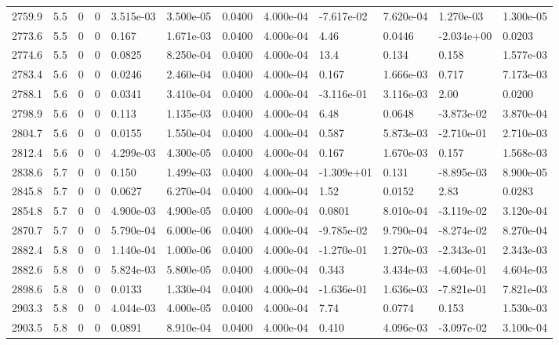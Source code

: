 \documentclass[preview]{standalone}
\begin{document}
{{{{{{{\begin{tabular}{L{1.2cm}C{1.2cm} C{0.3cm}C{0.5cm} C{1.4cm}C{1.4cm} C{1.4cm}C{1.4cm} C{1.6cm}C{1.6cm} C{1.6cm}C{1.6cm}}
  2759.9  &   5.5  & 0     &  0 &  3.515e-03  & 3.500e-05  &  0.0400&   4.000e-04& -7.617e-02 & 7.620e-04   &  1.270e-03 & 1.300e-05  \\ 
  2773.6  &   5.5  & 0     &  0 &  0.167  & 1.671e-03  &  0.0400&   4.000e-04& 4.46 & 0.0446   &  -2.034e+00 & 0.0203  \\ 
  2774.6  &   5.5  & 0     &  0 &  0.0825  & 8.250e-04  &  0.0400&   4.000e-04& 13.4 & 0.134   &  0.158 & 1.577e-03  \\ 
  2783.4  &   5.6  & 0     &  0 &  0.0246  & 2.460e-04  &  0.0400&   4.000e-04& 0.167 & 1.666e-03   &  0.717 & 7.173e-03  \\ 
  2788.1  &   5.6  & 0     &  0 &  0.0341  & 3.410e-04  &  0.0400&   4.000e-04& -3.116e-01 & 3.116e-03   &  2.00 & 0.0200  \\ 
  2798.9  &   5.6  & 0     &  0 &  0.113  & 1.135e-03  &  0.0400&   4.000e-04& 6.48 & 0.0648   &  -3.873e-02 & 3.870e-04  \\ 
  2804.7  &   5.6  & 0     &  0 &  0.0155  & 1.550e-04  &  0.0400&   4.000e-04& 0.587 & 5.873e-03   &  -2.710e-01 & 2.710e-03  \\ 
  2812.4  &   5.6  & 0     &  0 &  4.299e-03  & 4.300e-05  &  0.0400&   4.000e-04& 0.167 & 1.670e-03   &  0.157 & 1.568e-03  \\ 
  2838.6  &   5.7  & 0     &  0 &  0.150  & 1.499e-03  &  0.0400&   4.000e-04& -1.309e+01 & 0.131   &  -8.895e-03 & 8.900e-05  \\ 
  2845.8  &   5.7  & 0     &  0 &  0.0627  & 6.270e-04  &  0.0400&   4.000e-04& 1.52 & 0.0152   &  2.83 & 0.0283  \\ 
  2854.8  &   5.7  & 0     &  0 &  4.900e-03  & 4.900e-05  &  0.0400&   4.000e-04& 0.0801 & 8.010e-04   &  -3.119e-02 & 3.120e-04  \\ 
  2870.7  &   5.7  & 0     &  0 &  5.790e-04  & 6.000e-06  &  0.0400&   4.000e-04& -9.785e-02 & 9.790e-04   &  -8.274e-02 & 8.270e-04  \\ 
  2882.4  &   5.8  & 0     &  0 &  1.140e-04  & 1.000e-06  &  0.0400&   4.000e-04& -1.270e-01 & 1.270e-03   &  -2.343e-01 & 2.343e-03  \\ 
  2882.6  &   5.8  & 0     &  0 &  5.824e-03  & 5.800e-05  &  0.0400&   4.000e-04& 0.343 & 3.434e-03   &  -4.604e-01 & 4.604e-03  \\ 
  2898.6  &   5.8  & 0     &  0 &  0.0133  & 1.330e-04  &  0.0400&   4.000e-04& -1.636e-01 & 1.636e-03   &  -7.821e-01 & 7.821e-03  \\ 
  2903.3  &   5.8  & 0     &  0 &  4.044e-03  & 4.000e-05  &  0.0400&   4.000e-04& 7.74 & 0.0774   &  0.153 & 1.530e-03  \\ 
  2903.5  &   5.8  & 0     &  0 &  0.0891  & 8.910e-04  &  0.0400&   4.000e-04& 0.410 & 4.096e-03   &  -3.097e-02 & 3.100e-04  \\ 
\hline 
\end{tabular} 

}}}}}}}
\end{document}
